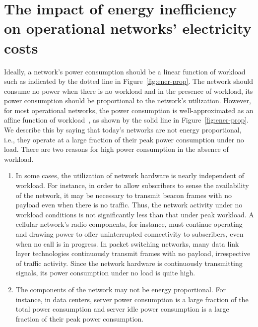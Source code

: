 \section{The impact of energy inefficiency on operational networks' electricity costs} 

Ideally, a network's power consumption should be a linear function of workload such as indicated by the dotted line in Figure~\ref{fig:ener-prop}. The network should consume no power when there is no workload and in the presence of workload, its power consumption should be proportional to the network's utilization. However, for most operational networks, the power consumption is well-approximated as an affine function of workload~\cite{Peng:2011:BTSSaving:Mobicom,Fan:power:ICSA:2007}, as shown by the solid line in Figure~\ref{fig:ener-prop}. We describe this by saying that today's networks are not energy proportional, i.e., they operate at a large fraction of their peak power consumption under no load. There are two reasons for high power consumption in the absence of workload. 
\begin{enumerate}
\item In some cases, the utilization of network hardware is nearly independent of workload. For instance, in order to allow subscribers to sense the availability of the network, it may be necessary to transmit beacon frames with no payload even when there is no traffic. Thus, the network activity under no workload conditions is not significantly less than that under peak workload. A cellular network's radio components, for instance, must continue operating and drawing power to offer uninterrupted connectivity to subscribers, even when no call is in progress. In packet switching networks, many data link layer technologies continuously transmit frames with no payload, irrespective of traffic activity. Since the network hardware is continuously transmitting signals, its power consumption under no load is quite high.
\item The components of the network may not be energy proportional. For instance, in data centers, server power consumption is a large fraction of the total power consumption and server idle power consumption is a large fraction of their peak power consumption. 
\end{enumerate}


